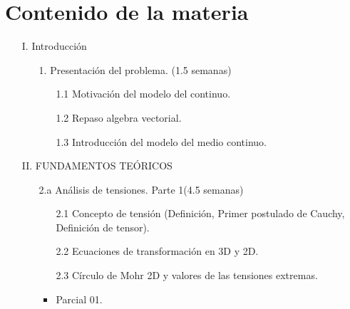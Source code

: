 \section*{Contenido de la materia}
%
\begin{itemize}
%
	\item[I.] Introducción
	\begin{itemize}
		\item[1.] Presentación del problema. (1.5 semanas)
		\begin{itemize}
			\item[1.1] Motivación del modelo del continuo.
			\item[1.2] Repaso algebra vectorial.	
			\item[1.3] Introducción del modelo del medio continuo.	
		\end{itemize}
	\end{itemize}
	\item[II.] FUNDAMENTOS TEÓRICOS
	\begin{itemize}
		\item[2.a] Análisis de tensiones. Parte 1(4.5 semanas)
		\begin{itemize}
			\item[2.1] Concepto de tensión (Definición, Primer postulado de Cauchy, Definición de tensor).			
			\item[2.2] Ecuaciones de transformación en 3D y 2D.
			\item[2.3] Círculo de Mohr 2D y valores de las tensiones extremas.
			\item Parcial 01.
		\end{itemize}			


\end{itemize}
\end{itemize}
